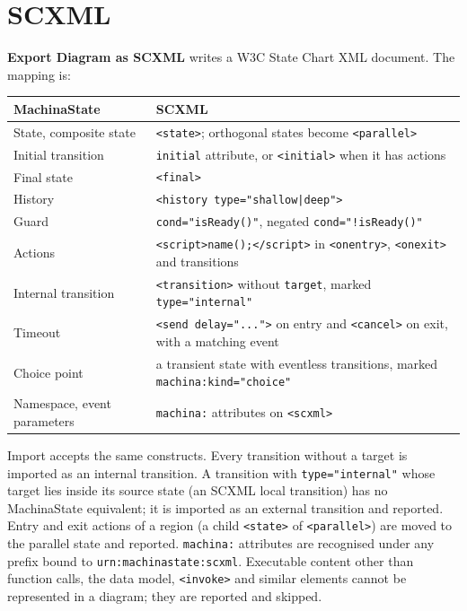 \documentclass[11pt,a4paper,openany]{report}
\newcommand{\ui}[1]{\textsf{\textbf{#1}}}
\newcommand{\code}[1]{\texttt{#1}}
\begin{document}
\section{SCXML}
\ui{Export Diagram as SCXML} writes a W3C State Chart XML document. The mapping is:
\begin{center}
\begin{tabularx}{\linewidth}{@{}lX@{}}
\toprule
\textbf{MachinaState} & \textbf{SCXML} \\
\midrule
State, composite state       & \code{<state>}; orthogonal states become \code{<parallel>} \\
Initial transition           & \code{initial} attribute, or \code{<initial>} when it has actions \\
Final state                  & \code{<final>} \\
History                      & \code{<history type="shallow|deep">} \\
Guard                        & \code{cond="isReady()"}, negated \code{cond="!isReady()"} \\
Actions                      & \code{<script>name();</script>} in \code{<onentry>}, \code{<onexit>} and transitions \\
Internal transition          & \code{<transition>} without \code{target}, marked \code{type="internal"} \\
Timeout                      & \code{<send delay="...">} on entry and \code{<cancel>} on exit, with a matching event \\
Choice point                 & a transient state with eventless transitions, marked \code{machina:kind="choice"} \\
Namespace, event parameters  & \code{machina:} attributes on \code{<scxml>} \\
\bottomrule
\end{tabularx}
\end{center}
Import accepts the same constructs. Every transition without a target is imported as an internal
transition. A transition with \code{type="internal"} whose target lies inside its source state (an SCXML
local transition) has no MachinaState equivalent; it is imported as an external transition and
reported. Entry and exit actions of a region (a child \code{<state>} of \code{<parallel>}) are moved to
the parallel state and reported. \code{machina:} attributes are recognised under any prefix bound to
\code{urn:machinastate:scxml}. Executable content other than function calls, the data model,
\code{<invoke>} and similar elements cannot be represented in a diagram; they are reported and skipped.
\end{document}
